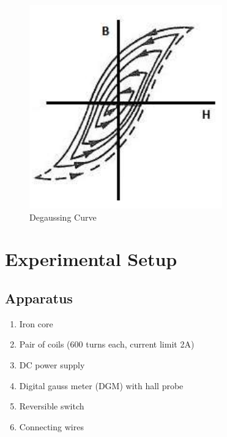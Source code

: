 \begin{figure}[H]
    \centering
    \includegraphics[width=0.6\columnwidth]{images/f2.png}
    \caption{Degaussing Curve}
    \label{fig:2}
\end{figure}

\section{Experimental Setup}

\subsection*{Apparatus}
\begin{enumerate}
    \item Iron core
    \item Pair of coils (600 turns each, current limit 2A)
    \item DC power supply
    \item Digital gauss meter (DGM) with hall probe
    \item Reversible switch
    \item Connecting wires
\end{enumerate}
